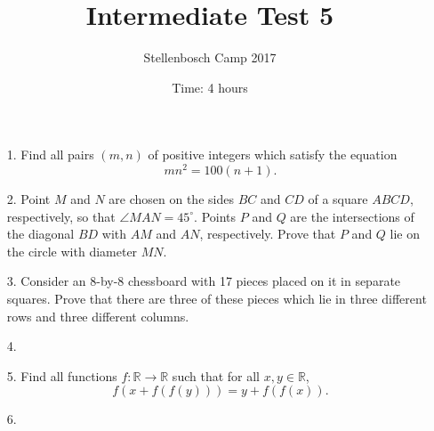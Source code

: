 \documentclass[12pt]{article}
\title{Intermediate Test 5}
\author{Stellenbosch Camp 2017}
\date{Time: 4 hours}
\begin{document}
 \maketitle

\begin{enumerate}

\item[1.] %
Find all pairs $(m,n)$ of positive integers which satisfy the equation
  \[ mn^2 = 100(n+1). \]


\item[2.] %
Point $M$ and $N$ are chosen on the sides $BC$ and $CD$ of a square $ABCD$, respectively, so that $\angle MAN = 45^\circ$. Points $P$ and $Q$ are the intersections of the diagonal $BD$ with $AM$ and $AN$, respectively. Prove that $P$ and $Q$ lie on the circle with diameter $MN$.


\item[3.] %
Consider an 8-by-8 chessboard with 17 pieces placed on it in separate squares. Prove that there are three of these pieces which lie in three different rows and three different columns.


\item[4.] %
 

\item[5.] %
Find all functions $f: \mathbb{R} \to \mathbb{R}$ such that for all $x,y \in \mathbb{R}$,
  \[ f(x+f(f(y))) = y+f(f(x)). \]


\item[6.] %


\end{enumerate}

\vfill

\centering
\begin{BVerbatim}
\end{BVerbatim}
\end{document}
